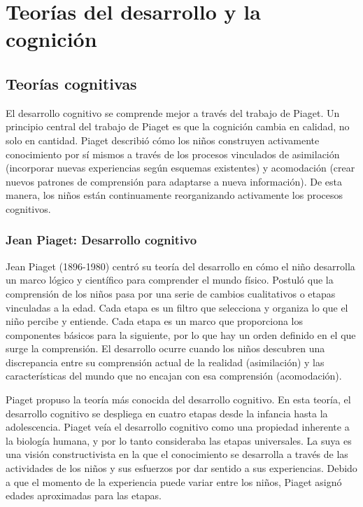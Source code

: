 \documentclass[11pt,letterpaper]{report}
\begin{document}
\section{Teorías del desarrollo y la cognición}
\subsection{Teorías cognitivas}
El desarrollo cognitivo se comprende mejor a través del trabajo de Piaget. Un
principio central del trabajo de Piaget es que la cognición cambia en calidad,
no solo en cantidad. Piaget describió cómo los niños construyen activamente
conocimiento por sí mismos a través de los procesos vinculados de asimilación
(incorporar nuevas experiencias según esquemas existentes) y acomodación (crear
nuevos patrones de comprensión para adaptarse a nueva información). De esta
manera, los niños están continuamente reorganizando activamente los procesos
cognitivos. \cite{Nelson19}

\subsubsection{Jean Piaget: Desarrollo cognitivo}
Jean Piaget (1896-1980) centró su teoría del desarrollo en cómo el niño
desarrolla un marco lógico y científico para comprender el mundo físico.
Postuló que la comprensión de los niños pasa por una serie de cambios
cualitativos o etapas vinculadas a la edad. Cada etapa es un filtro que
selecciona y organiza lo que el niño percibe y entiende. Cada etapa es un marco
que proporciona los componentes básicos para la siguiente, por lo que hay un
orden definido en el que surge la comprensión. El desarrollo ocurre cuando los
niños descubren una discrepancia entre su comprensión actual de la realidad
(asimilación) y las características del mundo que no encajan con esa
comprensión (acomodación). \cite{Feldman3}

Piaget propuso la teoría más conocida del desarrollo cognitivo. En esta teoría,
el desarrollo cognitivo se despliega en cuatro etapas desde la infancia hasta
la adolescencia. Piaget veía el desarrollo cognitivo como una propiedad
inherente a la biología humana, y por lo tanto consideraba las etapas
universales. La suya es una visión constructivista en la que el conocimiento se
desarrolla a través de las actividades de los niños y sus esfuerzos por dar
sentido a sus experiencias. Debido a que el momento de la experiencia puede
variar entre los niños, Piaget asignó edades aproximadas para las etapas.
\cite{Gauvain2022}
\end{document}
